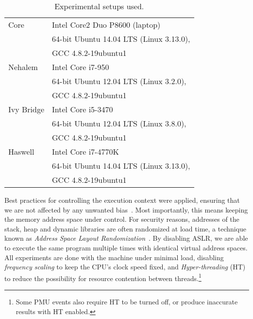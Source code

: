 \documentclass[10pt, conference, compsocconf]{IEEEtran}
\begin{document}

\begin{table}
  \caption{Experimental setups used.\label{tab:machines}}{
  \begin{tabular}{|l|l|}
    \hline
Core          & Intel\textsuperscript{\textregistered{}} Core\texttrademark{}2 Duo P8600 (laptop) \\
              & 64-bit Ubuntu 14.04 LTS (Linux 3.13.0),\\
              & GCC 4.8.2-19ubuntu1 \\ \hline
Nehalem       & Intel\textsuperscript{\textregistered{}} Core\texttrademark{} i7-950 \\
              & 64-bit Ubuntu 12.04 LTS (Linux 3.2.0),\\
              & GCC 4.8.2-19ubuntu1 \\ \hline
Ivy Bridge    & Intel\textsuperscript{\textregistered{}} Core\texttrademark{} i5-3470 \\
              & 64-bit Ubuntu 12.04 LTS (Linux 3.8.0),\\
              & GCC 4.8.2-19ubuntu1 \\ \hline
Haswell       & Intel\textsuperscript{\textregistered{}} Core\texttrademark{} i7-4770K \\
              & 64-bit Ubuntu 14.04 LTS (Linux 3.13.0),\\
              & GCC 4.8.2-19ubuntu1 \\ \hline
  \end{tabular}}
\end{table}

Best practices for controlling the execution context were applied, ensuring that we are not affected by any unwanted bias~\cite{Mytkowicz:2009:WrongData}.
Most importantly, this means keeping the memory address space under control.
For security reasons, addresses of the stack, heap and dynamic libraries are often randomized at load time, a technique known as \emph{Address Space Layout Randomization}~\cite{Pax:ASLR,Bhatkar:AddressObfuscation}. 
By disabling ASLR, we are able to execute the same program multiple times with identical virtual address spaces.
All experiments are done with the machine under minimal load, disabling \emph{frequency scaling} to keep the CPU's clock speed fixed, and \emph{Hyper-threading} (HT) to reduce the possibility for resource contention between threads.\footnote{Some PMU events also require HT to be turned off, or produce inaccurate results with HT enabled.}
\end{document}
